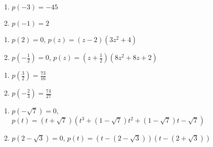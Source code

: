 \documentclass{ximera}
\begin{document}
\begin{multicols}{2}
\begin{enumerate}
\setcounter{enumi}{\value{HW}}

\item $p(-3)=-45$
\item $p(-1)=2$

\setcounter{HW}{\value{enumi}}
\end{enumerate}
\end{multicols}

\begin{multicols}{2}
\begin{enumerate}
\setcounter{enumi}{\value{HW}}

\item $p(2) =0$, $p(z)= (z-2) \left(3z^2+4\right)$
\item $p\left(-\frac{1}{2}\right) = 0$, $p(z)  = \left(z+\frac{1}{2}\right)\left(8z^2+8z+2\right)$

\setcounter{HW}{\value{enumi}}
\end{enumerate}
\end{multicols}

\begin{multicols}{2}
\begin{enumerate}
\setcounter{enumi}{\value{HW}}

\item $p\left(\frac{3}{2}\right) = \frac{73}{16}$
\item $p\left(-\frac{2}{3}\right) = \frac{74}{27}$

\setcounter{HW}{\value{enumi}}
\end{enumerate}
\end{multicols}

\begin{enumerate}
\setcounter{enumi}{\value{HW}}

\item $p(-\sqrt{7}) = 0$, $p(t) = (t+\sqrt{7})\left(t^3+(1-\sqrt{7}) t^2+(1-\sqrt{7})t-\sqrt{7}  \right)$
\item $p(2-\sqrt{3}) =0$, $p(t) = (t-(2-\sqrt{3}))(t-(2+\sqrt{3})) $

\setcounter{HW}{\value{enumi}}
\end{enumerate}
\end{document}
